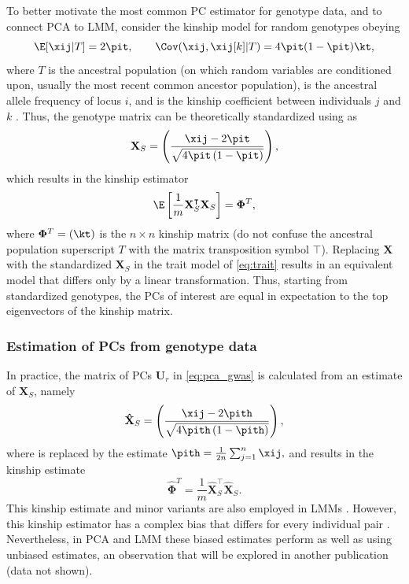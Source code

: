 \documentclass[11pt]{article}
\begin{document}
To better motivate the most common PC estimator for genotype data, and to connect PCA to LMM, consider the kinship model for random genotypes obeying
$$
\E[ \xij | T ]
=
2 \pit,
\quad\quad
\Cov( \xij, \xij[k] | T )
=
4 \pit ( 1 - \pit ) \kt,
$$
where $T$ is the ancestral population (on which random variables are conditioned upon, usually the most recent common ancestor population), \pit is the ancestral allele frequency of locus $i$, and \kt is the kinship coefficient between individuals $j$ and $k$ \citep{malecot_mathematiques_1948, wright_genetical_1951, jacquard_structures_1970}.
Thus, the genotype matrix can be theoretically standardized using \pit as
$$
\mathbf{X}_S
=
\left(
  \frac{
    \xij - 2 \pit
  }{
    \sqrt{4 \pit \left( 1 - \pit \right)}
  }
\right)
,
$$
which results in the kinship estimator
$$
\E
\left[
\frac{1}{m}
\mathbf{X}_S^\intercal
\mathbf{X}_S
\right]
=
\mathbf{\Phi}^T
,
$$
where $\mathbf{\Phi}^T = ( \kt )$ is the $n \times n$ kinship matrix (do not confuse the ancestral population superscript $T$ with the matrix transposition symbol $\intercal$).
Replacing $\mathbf{X}$ with the standardized $\mathbf{X}_S$ in the trait model of \cref{eq:trait} results in an equivalent model that differs only by a linear transformation.
Thus, starting from standardized genotypes, the PCs of interest are equal in expectation to the top eigenvectors of the kinship matrix.

\subsubsection{Estimation of PCs from genotype data}

In practice, the matrix of PCs $\mathbf{U}_r$ in \cref{eq:pca_gwas} is calculated from an estimate of $\mathbf{X}_S$, namely
\begin{equation*}
  \mathbf{\hat{X}}_S
  =
  \left(
    \frac{
      \xij - 2 \pith
    }{
      \sqrt{4 \pith \left( 1 - \pith \right)}
    }
  \right)
  ,
\end{equation*}
where \pit is replaced by the estimate
$
\pith = \frac{1}{2n} \sum_{j = 1}^n \xij,
$
and results in the kinship estimate
\begin{equation}
  \label{eq:kinship_std}
  \mathbf{\hat{\Phi}}^T
  =
  \frac{1}{m}
  \mathbf{\hat{X}}_S^\intercal
  \mathbf{\hat{X}}_S
  .
\end{equation}
This kinship estimate and minor variants are also employed in LMMs \citep{yang_gcta:_2011}.
However, this kinship estimator has a complex bias that differs for every individual pair \citep{ochoa_estimating_2021, ochoa_human}.
Nevertheless, in PCA and LMM these biased estimates perform as well as using unbiased estimates, an observation that will be explored in another publication (data not shown).
\end{document}
